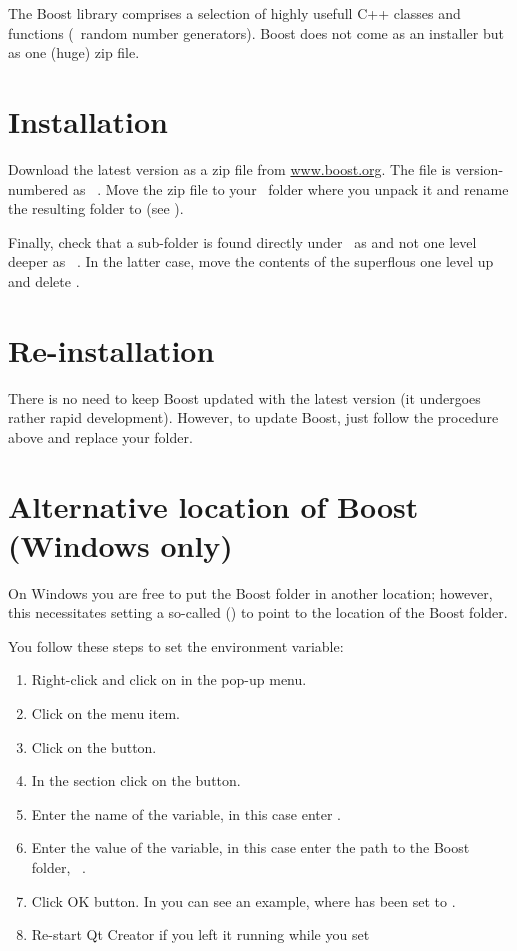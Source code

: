 The Boost library comprises a selection of highly usefull C++ classes and functions (\eg\ random number generators). Boost does not come as an installer but as one (huge) zip file.

\section{Installation}
Download the latest version as a zip file from \url{www.boost.org}. The file is version-numbered as \eg\ . Move the zip file to your \devhomefolderexplained\ folder where you unpack it and rename the resulting folder to  (see ).

Finally, check that a  sub-folder is found directly under  \ie\ as  and not one level deeper as \eg\ . In the latter case, move the contents of the superflous  one level up and delete .

\section{Re-installation}
There is no need to keep Boost updated with the latest version (it undergoes rather rapid development). However, to update Boost, just follow the procedure above and replace your  folder. 

\section{Alternative location of Boost (Windows only)}
On Windows you are free to put the Boost folder in another location; however, this necessitates setting a so-called  () to point to the location of the Boost folder.

You follow these steps to set the  environment variable:
\begin{enumerate}
\item Right-click  and click on  in the pop-up menu.
\item Click on the  menu item.
\item Click on the  button.
\item In the  section click on the  button.
\item Enter the name of the variable, in this case enter .
\item Enter the value of the variable, in this case enter the path to the Boost folder, \eg\ .
\item Click OK button. In  you can see an example, where  has been set to .
\item Re-start Qt Creator if you left it running while you set 
\end{enumerate}

